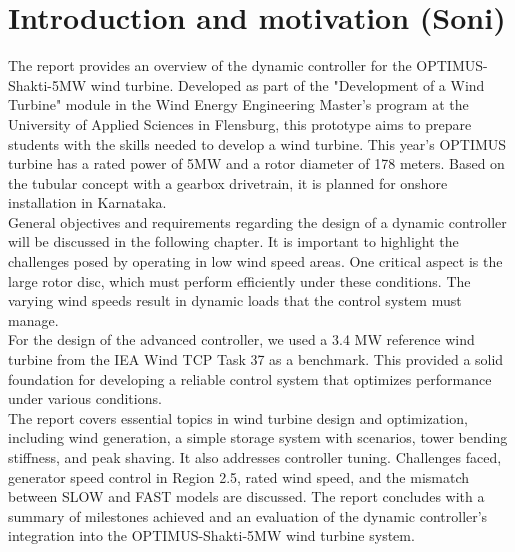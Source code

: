 \chapter{Introduction and motivation (Soni)}

The report provides an overview of the dynamic controller for the OPTIMUS-Shakti-5MW wind turbine. Developed as part of the "Development of a Wind Turbine" module in the Wind Energy Engineering Master’s program at the University of Applied Sciences in Flensburg, this prototype aims to prepare students with the skills needed to develop a wind turbine. This year’s OPTIMUS turbine has a rated power of 5MW and a rotor diameter of 178 meters. Based on the tubular concept with a gearbox drivetrain, it is planned for onshore installation in Karnataka.
\\[16pt]
General objectives and requirements regarding the design of a dynamic controller will be discussed in the following chapter. It is important to highlight the challenges posed by operating in low wind speed areas. One critical aspect is the large rotor disc, which must perform efficiently under these conditions. The varying wind speeds result in dynamic loads that the control system must manage.
\\[16pt]
For the design of the advanced controller, we used a 3.4 MW reference wind turbine from the IEA Wind TCP Task 37 as a benchmark. This provided a solid foundation for developing a reliable control system that optimizes performance under various conditions.
\\[16pt]
The report covers essential topics in wind turbine design and optimization, including wind generation, a simple storage system with scenarios, tower bending stiffness, and peak shaving. It also addresses controller tuning. Challenges faced, generator speed control in Region 2.5, rated wind speed, and the mismatch between SLOW and FAST models are discussed. The report concludes with a summary of milestones achieved and an evaluation of the dynamic controller's integration into the OPTIMUS-Shakti-5MW wind turbine system.